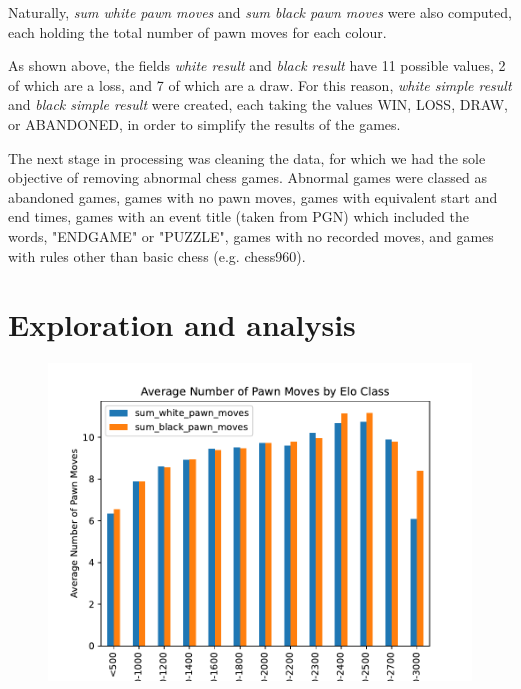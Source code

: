 \documentclass[11pt,a4paper]{article}
\begin{document}
Naturally, \textit{sum white pawn moves} and \textit{sum black pawn moves} were also computed, each holding the total number of pawn moves for each colour. 

As shown above, the fields \textit{white result} and \textit{black result} have 11 possible values, 2 of which are a loss, and 7 of which are a draw. 
For this reason, \textit{white simple result} and \textit{black simple result} were created, each taking the values WIN, LOSS, DRAW, or ABANDONED, in order to 
simplify the results of the games.

The next stage in processing was cleaning the data, for which we had the sole objective of removing abnormal chess games. 
Abnormal games were classed as abandoned games, games with no pawn moves, games with equivalent start and end times, games 
with an event title (taken from PGN) which included the words, "ENDGAME" or "PUZZLE", games with no recorded moves, and games 
with rules other than basic chess (e.g. chess960).

\section{Exploration and  analysis}

\begin{figure}
  \centering
  \includegraphics{fig1}
  \caption{}
  \label{}
\end{figure}
\end{document}
